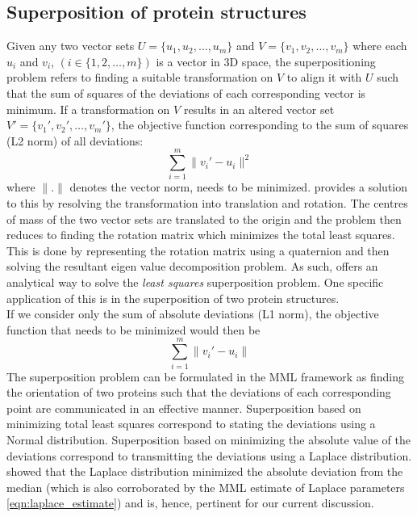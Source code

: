 \documentclass[wcp]{jmlr}
\begin{document}
\subsection{Superposition of protein structures}
Given any two vector sets $U = \{u_1,u_2,\ldots,u_m\}$ and $V = \{v_1,v_2,\ldots,v_m\}$
where each $u_i$ and $v_i$, $(i \in \{1,2,\ldots,m\})$ is a vector in 3D space, the 
superpositioning problem refers to finding a suitable transformation on $V$ to
align it with $U$ such that the sum of squares of the deviations of each corresponding
vector is minimum. If a transformation on $V$ results in an altered vector set 
$V'=\{v_1',v_2',\ldots,v_m'\}$, the objective function corresponding to the
sum of squares (L2 norm) of all deviations: 
\begin{equation} 
  \sum_{i=1}^m \|v_i'-u_i\|^2
\end{equation} where $\|.\|$ denotes the vector
norm, needs to be minimized. \citet{kearsley89} provides a solution to this by 
resolving the transformation into translation and rotation. The centres of mass of the
two vector sets are translated to the origin and the problem then reduces to finding the
rotation matrix which minimizes the total least squares. This is done by representing
the rotation matrix using a quaternion and then solving the resultant eigen value 
decomposition problem. As such, \citet{kearsley89} offers an analytical way to solve
the \emph{least squares} superposition problem. One specific application of this is in the
superposition of two protein structures. \\

If we consider only the sum of absolute deviations (L1 norm), the objective function 
that needs to be minimized would then be
\begin{equation} 
  \sum_{i=1}^m \|v_i'-u_i\| \label{L1_objective_function}
\end{equation}
The superposition problem can be formulated in the MML framework as finding the 
orientation of two proteins such that the deviations of each corresponding point
are communicated in an effective manner. Superposition based on minimizing total least
squares correspond to stating the deviations using a Normal distribution. 
Superposition based on minimizing the absolute value of the deviations correspond
to transmitting the deviations using a Laplace distribution. \citet{keynes-laplace} 
showed that the Laplace distribution minimized the absolute deviation from the median
(which is also corroborated by the MML estimate of Laplace parameters 
\eqref{eqn:laplace_estimate}) and is, hence, pertinent for our current discussion. \\
\end{document}
